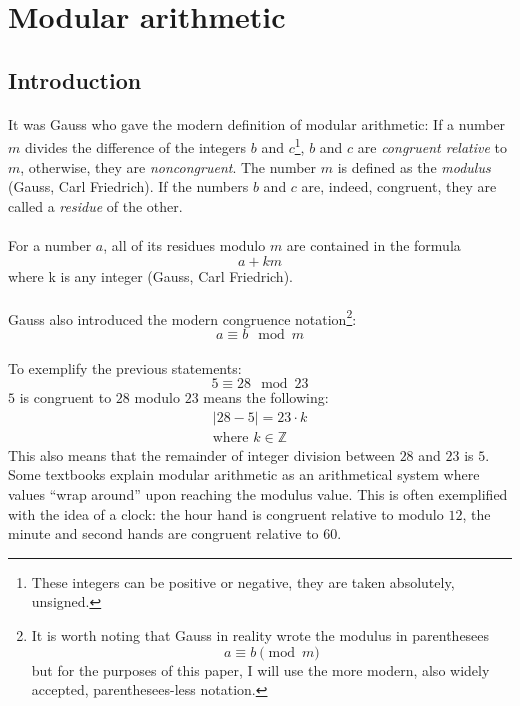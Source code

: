 \documentclass[a4paper, 10pt]{article}
\begin{document}
\section{Modular arithmetic}

\subsection{Introduction}
\paragraph*{}
It was Gauss who gave the modern definition of modular arithmetic: If a number $m$ divides the difference of the 
integers $b$ and $c$\footnote{These integers can be positive or negative, they are taken absolutely, unsigned.}, 
$b$ and $c$ are \textit{congruent relative} to $m$, otherwise, they are \textit{noncongruent}. The number $m$ is 
defined as the \textit{modulus} (Gauss, Carl Friedrich). If the numbers $b$ and $c$ are, indeed, congruent, they are 
called a \textit{residue} of the other.

\paragraph*{}
For a number $a$, all of its residues modulo $m$ are contained in the formula
$$a + km$$
where k is any integer (Gauss, Carl Friedrich).

\paragraph*{}
Gauss also introduced the modern congruence notation\footnote{It is worth noting that Gauss in reality wrote the 
modulus in parenthesees $$a \equiv b \pmod{m}$$ but for the purposes of this paper, I will use the more modern, also 
widely accepted, parenthesees-less notation.}:
$$a \equiv b \mod m$$

\paragraph*{}
To exemplify the previous statements:
$$5 \equiv 28 \mod 23$$
$5$ is congruent to $28$ modulo $23$ means the following:
\begin{gather*}
  \lvert 28 - 5 \rvert = 23 \cdot k\\
  \text{where } k \in \mathbb{Z}
\end{gather*}
This also means that the remainder of integer division between $28$ and $23$ is $5$. Some textbooks explain modular 
arithmetic as an arithmetical system where values ``wrap around'' upon reaching the modulus value. This is often 
exemplified with the idea of a clock: the hour hand is congruent relative to modulo $12$, the minute and second hands 
are congruent relative to $60$.
\end{document}
